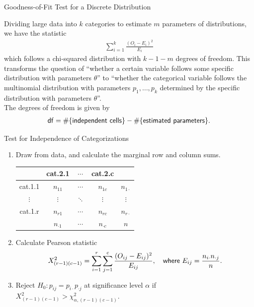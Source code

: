 \begin{frame}{Goodness-of-Fit Test for a Discrete Distribution}

\justifying
{} Dividing large data into $k$ categories to estimate $m$ parameters of distributions, we have the statistic
\begin{align*}
\sum_{i=1}^k \frac{(O_i - E_i)^2}{E_i}
\end{align*}
which follows a chi-squared distribution with $k-1-m$ degrees of freedom. This transforms the question of ``whether a certain variable follows some specific distribution with parameters $\theta$'' to ``whether the categorical variable follows the multinomial distribution with parameters $p_1,\ldots, p_k$ determined by the specific distribution with parameters $\theta$''.\\
 The degrees of freedom is given by
\begin{align*}
\mathsf{df} = \#\{\mathsf{independent\ cells}\} - \#\{\mathsf{estimated\ parameters}\}.
\end{align*}

\end{frame}

\begin{frame}{Test for Independence of Categorizations}

\begin{enumerate}
	\justifying
	\item Draw  from data, and calculate the marginal row and column sums.
	\begin{table}
		\footnotesize
		\centering
		\begin{tabular}{c|ccc|c}
			 & cat.2.1 & $\cdots$ & cat.2.c & \\
			\hline
			cat.1.1 & $n_{11}$ & $\cdots$ & $n_{1c}$ & $n_{1\cdot}$ \\
			$\vdots$ & $\vdots$ & $\ddots$ & $\vdots$ & $\vdots$ \\
			cat.1.r & $n_{r1}$ & $\cdots$ & $n_{rc}$ & $n_{r\cdot}$ \\
			\hline
			& $n_{\cdot 1}$ & $\cdots$ & $n_{\cdot c}$ & $n$
		\end{tabular}
	\end{table}
	\item Calculate Pearson statistic
	\footnotesize
	\begin{align*}
	X^2_{(r-1)(c-1)} = \sum_{i=1}^r \sum_{j=1}^c \frac{(O_{ij}-E_{ij})^2}{E_{ij}}, \quad \mathsf{where\ } E_{ij} = \frac{n_{i\cdot}n_{\cdot j}}{n}.
	\end{align*}
	\normalsize
	\item Reject $H_0: p_{ij} = p_{i\cdot}p_{\cdot j}$ at significance level $\alpha$ if $X^2_{(r-1)(c-1)} > \chi_{\alpha,(r-1)(c-1)}^2$.
\end{enumerate}

\end{frame}



